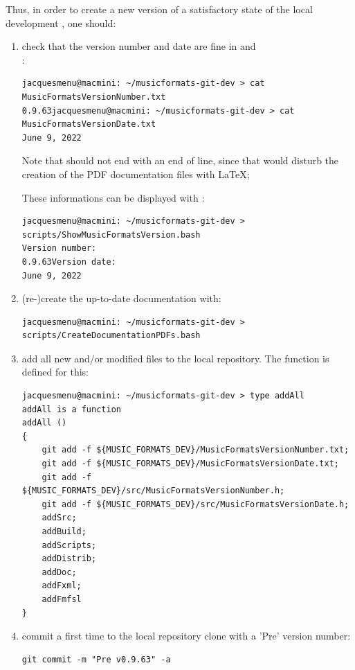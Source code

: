 Thus, in order to create a new version of a satisfactory state of the local development \repo, one should:
\begin{enumerate}

\item check that the version number and date are fine in  and \\:
\begin{lstlisting}[language=TerminalSmall]
jacquesmenu@macmini: ~/musicformats-git-dev > cat MusicFormatsVersionNumber.txt
0.9.63jacquesmenu@macmini: ~/musicformats-git-dev > cat MusicFormatsVersionDate.txt
June 9, 2022
\end{lstlisting}
Note that  should not end with an end of line, since that would disturb the creation of the PDF documentation files with \LaTeX;

These informations can be displayed with :
\begin{lstlisting}[language=Terminal]
jacquesmenu@macmini: ~/musicformats-git-dev > scripts/ShowMusicFormatsVersion.bash 
Version number:
0.9.63Version date:
June 9, 2022
\end{lstlisting}


\item (re-)create the up-to-date documentation with:
\begin{lstlisting}[language=TerminalSmall]
jacquesmenu@macmini: ~/musicformats-git-dev > scripts/CreateDocumentationPDFs.bash
\end{lstlisting}


\item add all new and/or modified files to the local repository. The  function is defined for this:
\begin{lstlisting}[language=Terminal]
jacquesmenu@macmini: ~/musicformats-git-dev > type addAll
addAll is a function
addAll () 
{ 
    git add -f ${MUSIC_FORMATS_DEV}/MusicFormatsVersionNumber.txt;
    git add -f ${MUSIC_FORMATS_DEV}/MusicFormatsVersionDate.txt;
    git add -f ${MUSIC_FORMATS_DEV}/src/MusicFormatsVersionNumber.h;
    git add -f ${MUSIC_FORMATS_DEV}/src/MusicFormatsVersionDate.h;
    addSrc;
    addBuild;
    addScripts;
    addDistrib;
    addDoc;
    addFxml;
    addFmfsl
}
\end{lstlisting}


\item commit a first time to the local repository clone with a 'Pre' version number:
\begin{lstlisting}[language=Terminal]
git commit -m "Pre v0.9.63" -a
\end{lstlisting}



\end{enumerate}
